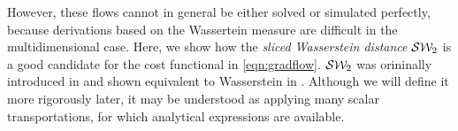 However, these flows cannot in general be either solved or simulated perfectly, because derivations based on the Wassertein measure are difficult in the multidimensional case.  Here, we show how the \textit{sliced Wasserstein distance} ${\cal S}{\cal W}_2$ is a good candidate for the cost functional in \eqref{eqn:gradflow}.  ${\cal S}{\cal W}_2$ was orininally introduced in \cite{pitie2005n} and shown equivalent to Wasserstein in \cite{bonnotte2013unidimensional}. Although we will define it more rigorously later, it may be understood as applying many scalar transportations, for which analytical expressions are available.


